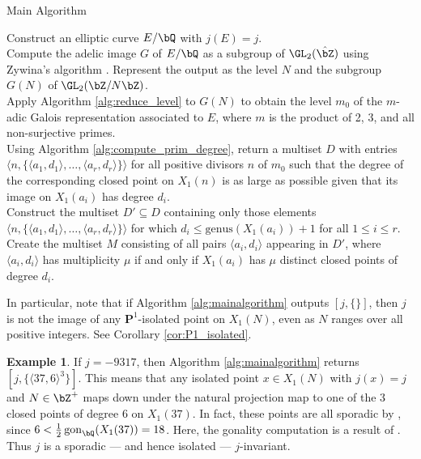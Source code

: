 \documentclass[11pt,reqno]{amsart}
\theoremstyle{plain}
\theoremstyle{definition}
\newtheorem{example}[theorem]{Example}
\DeclareMathOperator{\gon}{gon}
\newcommand{\Q}{\bQ}
\newcommand{\Z}{\bZ}
\begin{document}
\setcounter{algocf}{0}
\begin{algorithm}[h!]
\caption{Main Algorithm}\label{alg:mainalgorithm}
\KwIn{A non-CM $j$-invariant $j \in \Q$.}
Construct an elliptic curve $E/\Q$ with $j(E)=j$.\\
Compute the adelic image $G$ of $E/\Q$ as a subgroup of $\GL_2(\hat{\Z})$ using Zywina's algorithm \cite{ZywinaAlgorithm}. Represent the output as the level $N$ and the subgroup $G(N)$ of $\GL_2(\Z/N\Z)$.\\
Apply Algorithm \ref{alg:reduce_level} to $G(N)$ to obtain the level $m_0$ of the $m$-adic Galois representation associated to $E$, where $m$ is the product of 2, 3, and all non-surjective primes.\\
Using Algorithm \ref{alg:compute_prim_degree}, return a multiset $D$ with entries $\langle n, \{\langle a_1, d_1\rangle ,  \dots,  \langle a_r, d_r\rangle \} \rangle$
    for all positive divisors $n$ of $m_0$ such that the degree of the corresponding 
    closed point on $X_1(n)$ is as large as possible given that its image on $X_1(a_i) $
    has degree $d_i$.\\
Construct the multiset $D' \subseteq D$ containing only those elements $\langle n, \{\langle a_1, d_1\rangle ,  \dots,  \langle a_r, d_r\rangle \} \rangle$ for which $d_i \leq \text{genus}(X_1(a_i))+1$ for all $1 \leq i \leq r$.\\
Create the multiset $M$ consisting of all pairs $\langle a_i,d_i\rangle $ appearing in $D'$, where $\langle a_i,d_i\rangle $ has multiplicity $\mu$ if and only if $X_1(a_i)$ has $\mu$ distinct closed points of degree $d_i$.\\
\Return{$[j,M]$} 

\end{algorithm}

In particular, note that if Algorithm \ref{alg:mainalgorithm} outputs $[j,\{\}]$, then $j$ is not the image of any $\mathbf{P}^1$-isolated point on $X_1(N)$, even as $N$ ranges over all positive integers. See Corollary \ref{cor:P1_isolated}.

\begin{example}
If $j=-9317$, then Algorithm \ref{alg:mainalgorithm} returns $[j, \{\langle 37,6\rangle ^3\}]$. This means that any isolated point $x\in X_1(N)$ with $j(x)=j$ and $N \in \Z^+$ maps down under the natural projection map to one of the 3 closed points of degree 6 on $X_1(37)$. In fact, these points are all sporadic by \cite[Proposition 2]{frey}, since $6 < \frac{1}{2} \gon_{\Q}(X_1(37)) = 18$. Here, the gonality computation is a result of \cite{DerickxVanHoeij2014}. Thus $j$ is a sporadic --- and hence isolated --- $j$-invariant.
\end{example}
\end{document}
